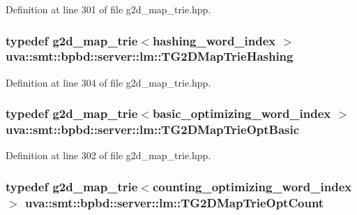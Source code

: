 Definition at line 301 of file g2d\+\_\+map\+\_\+trie.\+hpp.

\hypertarget{namespaceuva_1_1smt_1_1bpbd_1_1server_1_1lm_a9489cf38c3a8b7c72eed9f82e66e9c82}{}
\subsubsection[{T\+G2\+D\+Map\+Trie\+Hashing}]{\setlength{\rightskip}{0pt plus 5cm}typedef {\bf g2d\+\_\+map\+\_\+trie}$<${\bf hashing\+\_\+word\+\_\+index} $>$ {\bf uva\+::smt\+::bpbd\+::server\+::lm\+::\+T\+G2\+D\+Map\+Trie\+Hashing}}\label{namespaceuva_1_1smt_1_1bpbd_1_1server_1_1lm_a9489cf38c3a8b7c72eed9f82e66e9c82}


Definition at line 304 of file g2d\+\_\+map\+\_\+trie.\+hpp.

\hypertarget{namespaceuva_1_1smt_1_1bpbd_1_1server_1_1lm_add82ae9c6e35ced16e2bab4082204f5c}{}
\subsubsection[{T\+G2\+D\+Map\+Trie\+Opt\+Basic}]{\setlength{\rightskip}{0pt plus 5cm}typedef {\bf g2d\+\_\+map\+\_\+trie}$<${\bf basic\+\_\+optimizing\+\_\+word\+\_\+index} $>$ {\bf uva\+::smt\+::bpbd\+::server\+::lm\+::\+T\+G2\+D\+Map\+Trie\+Opt\+Basic}}\label{namespaceuva_1_1smt_1_1bpbd_1_1server_1_1lm_add82ae9c6e35ced16e2bab4082204f5c}


Definition at line 302 of file g2d\+\_\+map\+\_\+trie.\+hpp.

\hypertarget{namespaceuva_1_1smt_1_1bpbd_1_1server_1_1lm_a959c20502ff1c42c334d2539e2b00b1d}{}
\subsubsection[{T\+G2\+D\+Map\+Trie\+Opt\+Count}]{\setlength{\rightskip}{0pt plus 5cm}typedef {\bf g2d\+\_\+map\+\_\+trie}$<${\bf counting\+\_\+optimizing\+\_\+word\+\_\+index} $>$ {\bf uva\+::smt\+::bpbd\+::server\+::lm\+::\+T\+G2\+D\+Map\+Trie\+Opt\+Count}}\label{namespaceuva_1_1smt_1_1bpbd_1_1server_1_1lm_a959c20502ff1c42c334d2539e2b00b1d}


